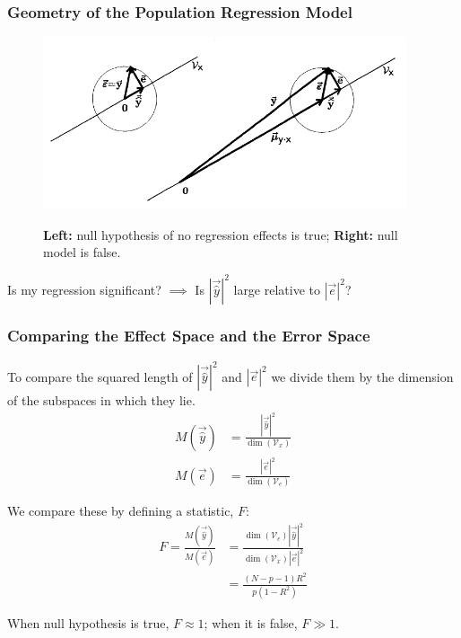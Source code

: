 \documentclass{beamer}
\begin{document}
\begin{frame}
  \frametitle{Geometry of the Population Regression Model}


\begin{figure}
{\centering \includegraphics[height=2in]{regr-error-model2.pdf}}
\caption{\textbf{Left:} null hypothesis of no regression effects is true; \textbf{Right:} null model is false.}
\end{figure}

\begin{center}
\alert{Is my regression significant? $\implies$ Is $|\vec{\hat{y}}|^2$ large relative to $|\vec{e}|^2$?}
\end{center}

\end{frame}

\begin{frame}
  \frametitle{Comparing the Effect Space and the Error Space}

To compare the squared length of $|\vec{\hat{y}}|^2$ and $|\vec{e}|^2$ we divide them by the dimension of the subspaces in which they lie.
\begin{align*}
M(\vec{\hat{y}}) &= \frac{|\vec{\hat{y}}|^2} {\dim(\mathcal{V}_x)}   \\
M(\vec{e})       &= \frac{|\vec{e}|^2}{\dim(\mathcal{V}_e)}
\end{align*}

We compare these by defining a statistic, $F$:
\begin{align*}
  F = \frac{M(\vec{\hat{y}})}{M(\vec{e})} &= \frac{\dim(\mathcal{V}_e)|\vec{\hat{y}}|^2}
                                                  {\dim(\mathcal{V}_x)|\vec{e}|^2}\\
 &= \frac{(N-p-1)R^2}{p(1-R^2)}
\end{align*}

\alert{When null hypothesis is true, $F\approx 1$; when it is false, $F \gg 1$.}

\end{frame}
\end{document}
